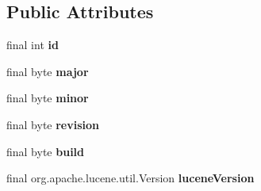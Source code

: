 \subsection*{Public Attributes}
\begin{DoxyCompactItemize}
\item 
\hypertarget{classorg_1_1elasticsearch_1_1_version_a7d0441a885a0f1709edc88263f0be6ff}{}\label{classorg_1_1elasticsearch_1_1_version_a7d0441a885a0f1709edc88263f0be6ff} 
final int {\bfseries id}
\item 
\hypertarget{classorg_1_1elasticsearch_1_1_version_a31ea702852277aa45220b971ea4bf680}{}\label{classorg_1_1elasticsearch_1_1_version_a31ea702852277aa45220b971ea4bf680} 
final byte {\bfseries major}
\item 
\hypertarget{classorg_1_1elasticsearch_1_1_version_ae95e9b67f246cabaf72000b40ebad7ce}{}\label{classorg_1_1elasticsearch_1_1_version_ae95e9b67f246cabaf72000b40ebad7ce} 
final byte {\bfseries minor}
\item 
\hypertarget{classorg_1_1elasticsearch_1_1_version_acd9113301ce4c217150d91740b194242}{}\label{classorg_1_1elasticsearch_1_1_version_acd9113301ce4c217150d91740b194242} 
final byte {\bfseries revision}
\item 
\hypertarget{classorg_1_1elasticsearch_1_1_version_ae323f5d192871d0d18a36ff7f4c91b7d}{}\label{classorg_1_1elasticsearch_1_1_version_ae323f5d192871d0d18a36ff7f4c91b7d} 
final byte {\bfseries build}
\item 
\hypertarget{classorg_1_1elasticsearch_1_1_version_a040e34412520e347db6f3a4035a31833}{}\label{classorg_1_1elasticsearch_1_1_version_a040e34412520e347db6f3a4035a31833} 
final org.\+apache.\+lucene.\+util.\+Version {\bfseries lucene\+Version}
\end{DoxyCompactItemize}
